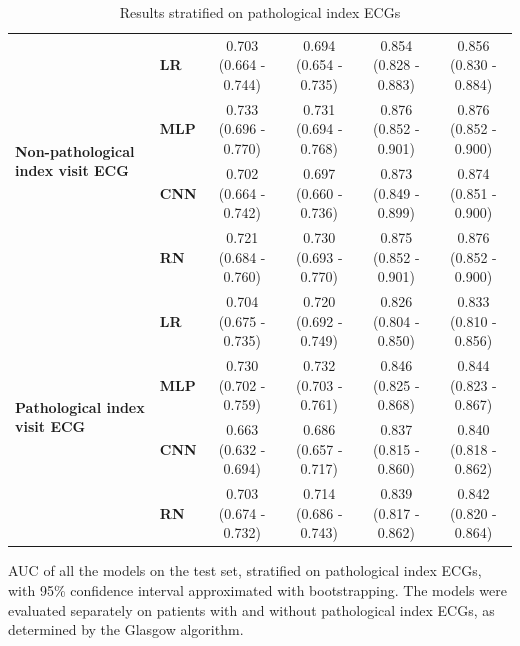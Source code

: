 \documentclass[preprint]{elsarticle}
\begin{document}
\begin{table}[H]
\begin{adjustbox}{center}
\begin{tabular}{@{}llcccc@{}}
\multirow{4}{*}{\begin{minipage}{0.65in}\textbf{Non-pathological index visit ECG}\end{minipage}} %
& \textbf{LR}  & 0.703 (0.664 - 0.744) & 0.694 (0.654 - 0.735) & 0.854 (0.828 - 0.883) & 0.856 (0.830 - 0.884) \\
& \textbf{MLP} & 0.733 (0.696 - 0.770) & 0.731 (0.694 - 0.768) & 0.876 (0.852 - 0.901) & 0.876 (0.852 - 0.900) \\
& \textbf{CNN} & 0.702 (0.664 - 0.742) & 0.697 (0.660 - 0.736) & 0.873 (0.849 - 0.899) & 0.874 (0.851 - 0.900) \\
& \textbf{RN}  & 0.721 (0.684 - 0.760) & 0.730 (0.693 - 0.770) & 0.875 (0.852 - 0.901) & 0.876 (0.852 - 0.900) \\
  \cmidrule(lr){1-2}
\multirow{4}{*}{\begin{minipage}{0.65in}\textbf{Pathological index visit ECG}\end{minipage}} %
& \textbf{LR}  & 0.704 (0.675 - 0.735) & 0.720 (0.692 - 0.749) & 0.826 (0.804 - 0.850) & 0.833 (0.810 - 0.856) \\
& \textbf{MLP} & 0.730 (0.702 - 0.759) & 0.732 (0.703 - 0.761) & 0.846 (0.825 - 0.868) & 0.844 (0.823 - 0.867) \\
& \textbf{CNN} & 0.663 (0.632 - 0.694) & 0.686 (0.657 - 0.717) & 0.837 (0.815 - 0.860) & 0.840 (0.818 - 0.862) \\
& \textbf{RN}  & 0.703 (0.674 - 0.732) & 0.714 (0.686 - 0.743) & 0.839 (0.817 - 0.862) & 0.842 (0.820 - 0.864) \\

\bottomrule
\end{tabular}
\end{adjustbox}
\caption{Results stratified on pathological index ECGs}
\medskip
\small
AUC of all the models on the test set, stratified on pathological index ECGs, with 95\% confidence interval approximated with bootstrapping. The models were evaluated separately on patients with and without pathological index ECGs, as determined by the Glasgow algorithm. 
\label{table:appendix:pathological}
\end{table}
\renewcommand{\arraystretch}{1}
\end{document}
